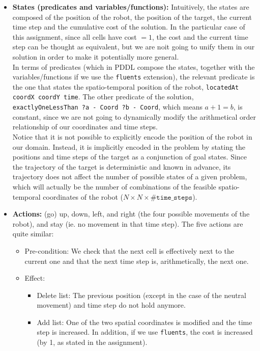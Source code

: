 \documentclass{article}
\begin{document}
\begin{enumerate}
\begin{itemize}
    \item \textbf{States (predicates and variables/functions):} Intuitively, the states are composed of the position of the robot, the position of the target, the current time step and the cumulative cost of the solution. In the particular case of this assignment, since all cells have cost $= 1$, the cost and the current time step can be thought as equivalent, but we are noit going to unify them in our solution in order to make it potentially more general.\\ In terms of predicates (which in PDDL compose the states, together with the variables/functions if we use the \texttt{fluents} extension), the relevant predicate is the one that states the spatio-temporal position of the robot, \texttt{locatedAt coordX coordY time}. The other predicate of the solution, \texttt{exactlyOneLessThan ?a - Coord ?b - Coord}, which means $a + 1 = b$, is constant, since we are not going to dynamically modify the arithmetical order relationship of our coordinates and time steps.\\Notice that it is not possible to explicitly encode the position of the robot in our domain. Instead, it is implicitly encoded in the problem by stating the positions and time steps of the target as a conjunction of goal states. Since the trajectory of the target is deterministic and known in advance, its trajectory does not affect the number of possible states of a given problem, which will actually be the number of combinations of the feasible spatio-temporal coordinates of the robot ($N \times N \times \# \texttt{time\_steps}$).
    \item \textbf{Actions:} (go) up, down, left, and right (the four possible movements of the robot), and stay (ie. no movement in that time step). The five actions are quite similar: \begin{itemize}
        \item Pre-condition: We check that the next cell is effectively next to the current one and that the next time step is, arithmetically, the next one.
        \item Effect: \begin{itemize}
            \item Delete list: The previous position (except in the case of the neutral movement) and time step do not hold anymore.
            \item Add list: One of the two spatial coordinates is modified and the time step is increased. In addition, if we use \texttt{fluents}, the cost is increased (by 1, as stated in the assignment).

\end{itemize}
\end{itemize}
\end{itemize}
\end{enumerate}
\end{document}
